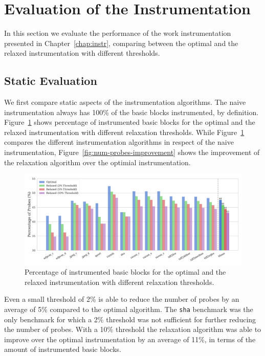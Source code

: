 \section{Evaluation of the Instrumentation}

In this section we evaluate the performance of the work instrumentation presented in Chapter~\ref{chap:instr}, comparing between the optimal and the relaxed instrumentation with different thresholds.

\subsection{Static Evaluation}

We first compare static aspects of the instrumentation algorithms.
The naive instrumentation always has 100\% of the basic blocks instrumented, by definition.
Figure~\ref{fig:num-probes} shows percentage of instrumented basic blocks for the optimal and the relaxed instrumentation with different relaxation thresholds.
While Figure~\ref{fig:num-probes} compares the different instrumentation algorithms in respect of the naive instrumentation, Figure~\ref{fig:num-probes-improvement} shows the improvement of the relaxation algorithm over the optimial instrumentation.

\begin{figure}[ht]
    \centering
    \includegraphics[width=\textwidth]{figs/num-probes.pdf}
    \caption{Percentage of instrumented basic blocks for the optimal and the relaxed instrumentation with different relaxation thresholds.}
    \label{fig:num-probes}
\end{figure}

Even a small threshold of 2\% is able to reduce the number of probes by an average of 5\% compared to the optimal algorithm. 
The \texttt{sha} benchmark was the only benchmark for which a 2\% threshold was not sufficient for further reducing the number of probes.
With a 10\% threshold the relaxation algorithm was able to improve over the optimal instrumentation by an average of 11\%, in terms of the amount of instrumented basic blocks.

